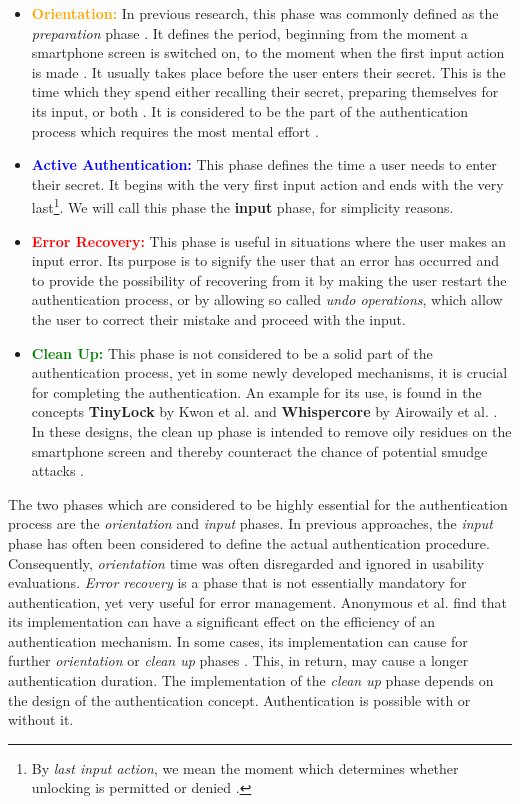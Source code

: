 \begin{itemize}
    \item \textbf{\textcolor{orange}{Orientation:}} In previous research, this phase was commonly defined as the \textit{preparation} phase \cite{anonymous}. It defines the period, beginning from the moment a smartphone screen is switched on, to the moment when the first input action is made \cite{anonymous}. It usually takes place before the user enters their secret. This is the time which they spend either recalling their secret, preparing themselves for its input, or both \cite{anonymous}. It is considered to be the part of the authentication process which requires the most mental effort \cite{anonymous}.  
    \item \textbf{\textcolor{blue}{Active Authentication:}} This phase defines the time a user needs to enter their secret. It begins with the very first input action and ends with the very last\footnote{By \textit{last input action}, we mean the moment which determines whether unlocking is permitted or denied \cite{anonymous}.}. We will call this phase the \textbf{input} phase, for simplicity reasons.
    \item \textbf{\textcolor{red}{Error Recovery:}} This phase is useful in situations where the user makes an input error. Its purpose is to signify the user that an error has occurred and to provide the possibility of recovering from it by making the user restart the authentication process, or by allowing so called \textit{undo operations}, which allow the user to correct their mistake and proceed with the input. 
    \item \textbf{\textcolor{green}{Clean Up:}} This phase is not considered to be a solid part of the authentication process, yet in some newly developed mechanisms, it is crucial for completing the authentication. An example for its use, is found in the concepts \textbf{TinyLock} by Kwon et al. \cite{kwon} and \textbf{Whispercore} by Airowaily et al. \cite{Airowaily}. In these designs, the clean up phase is intended to remove oily residues on the smartphone screen and thereby counteract the chance of potential smudge attacks \cite{anonymous}. 
\end{itemize}

The two phases which are considered to be highly essential for the authentication process are the \textit{orientation} and \textit{input} phases. In previous approaches, the \textit{input} phase has often been considered to define the actual authentication procedure. Consequently, \textit{orientation} time was often disregarded and ignored in usability evaluations. \textit{Error recovery} is a phase that is not essentially mandatory for authentication, yet very useful for error management. Anonymous et al. \cite{anonymous} find that its implementation can have a significant effect on the efficiency of an authentication mechanism. In some cases, its implementation can cause for further \textit{orientation} or \textit{clean up} phases \cite{anonymous}. This, in return, may cause a longer authentication duration. The implementation of the \textit{clean up} phase depends on the design of the authentication concept. Authentication is possible with or without it. \\

